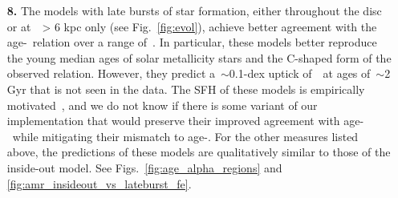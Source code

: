 \documentclass[draft2.tex]{subfiles}
\begin{document}
\begin{enumerate}
	\item[\textbf{8.}] The models with late bursts of star formation, either 
	throughout the disc or at~\rgal~> 6 kpc only (see Fig.~\ref{fig:evol}), 
	achieve better agreement with the~\citet{Feuillet2019} age-\feh~relation 
	over a range of~\rgal. 
	In particular, these models better reproduce the young median ages of solar 
	metallicity stars and the C-shaped form of the observed relation. 
	However, they predict a~$\sim$0.1-dex uptick of~\ofe~at ages of~$\sim$2 Gyr 
	that is not seen in the data. 
	The SFH of these models is empirically motivated~\citep{Mor2019, Isern2019}, 
	and we do not know if there is some variant of our implementation that 
	would preserve their improved agreement with age-\feh~while mitigating 
	their mismatch to age-\ofe. 
	For the other measures listed above, the predictions of these models are 
	qualitatively similar to those of the inside-out model. 
	See Figs.~\ref{fig:age_alpha_regions} and 
	\ref{fig:amr_insideout_vs_lateburst_fe}. 

\end{enumerate} 
\end{document}

